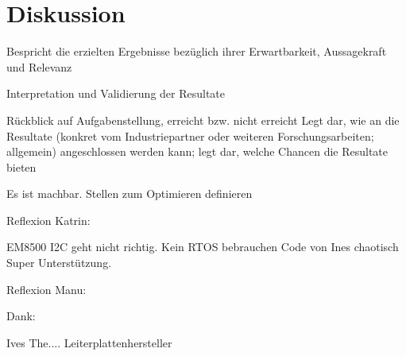 \chapter{Diskussion}

Bespricht die erzielten Ergebnisse bezüglich ihrer Erwartbarkeit, Aussagekraft und Relevanz

Interpretation und Validierung der Resultate

Rückblick auf Aufgabenstellung, erreicht bzw. nicht erreicht
Legt dar, wie an die Resultate (konkret vom Industriepartner oder weiteren
Forschungsarbeiten; allgemein) angeschlossen werden kann; legt dar, welche Chancen die
Resultate bieten


Es ist machbar.
Stellen zum Optimieren definieren


Reflexion Katrin:

EM8500 I2C geht nicht richtig.
Kein RTOS bebrauchen
Code von Ines chaotisch
Super Unterstützung.

Reflexion Manu:





Dank:

Ives The.... 
Leiterplattenhersteller



